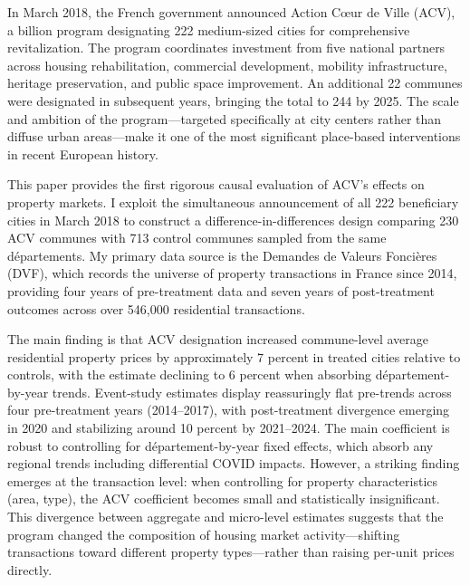 \documentclass[12pt]{article}
\newcommand{\euro}{\texteuro}
\begin{document}
In March 2018, the French government announced Action C\oe ur de Ville (ACV), a \euro 5 billion program designating 222 medium-sized cities for comprehensive revitalization. The program coordinates investment from five national partners across housing rehabilitation, commercial development, mobility infrastructure, heritage preservation, and public space improvement. An additional 22 communes were designated in subsequent years, bringing the total to 244 by 2025. The scale and ambition of the program---targeted specifically at city centers rather than diffuse urban areas---make it one of the most significant place-based interventions in recent European history.

This paper provides the first rigorous causal evaluation of ACV's effects on property markets. I exploit the simultaneous announcement of all 222 beneficiary cities in March 2018 to construct a difference-in-differences design comparing 230 ACV communes with 713 control communes sampled from the same d\'{e}partements. My primary data source is the Demandes de Valeurs Fonci\`{e}res (DVF), which records the universe of property transactions in France since 2014, providing four years of pre-treatment data and seven years of post-treatment outcomes across over 546,000 residential transactions.

The main finding is that ACV designation increased commune-level average residential property prices by approximately 7 percent in treated cities relative to controls, with the estimate declining to 6 percent when absorbing d\'{e}partement-by-year trends. Event-study estimates display reassuringly flat pre-trends across four pre-treatment years (2014--2017), with post-treatment divergence emerging in 2020 and stabilizing around 10 percent by 2021--2024. The main coefficient is robust to controlling for d\'{e}partement-by-year fixed effects, which absorb any regional trends including differential COVID impacts. However, a striking finding emerges at the transaction level: when controlling for property characteristics (area, type), the ACV coefficient becomes small and statistically insignificant. This divergence between aggregate and micro-level estimates suggests that the program changed the composition of housing market activity---shifting transactions toward different property types---rather than raising per-unit prices directly.
\end{document}
